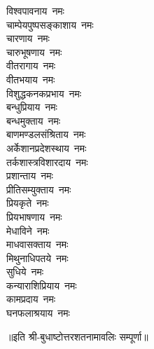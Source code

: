 \begin{flushleft}
\begin{multicols}{2}
विश्वपावनाय~नमः\\
चाम्पेयपुष्पसङ्काशाय~नमः\\
चारणाय~नमः\\
चारुभूषणाय~नमः\\
वीतरागाय~नमः\hfill{}\\
वीतभयाय~नमः\\
विशुद्धकनकप्रभाय~नमः\\
बन्धुप्रियाय~नमः\\
बन्धमुक्ताय~नमः\\
बाणमण्डलसंश्रिताय~नमः\\
अर्केशानप्रदेशस्थाय~नमः\\
तर्कशास्त्रविशारदाय~नमः\\
प्रशान्ताय~नमः\\
प्रीतिसम्युक्ताय~नमः\\
प्रियकृते~नमः\hfill{}\\
प्रियभाषणाय~नमः\\
मेधाविने~नमः\\
माधवासक्ताय~नमः\\
मिथुनाधिपतये~नमः\\
सुधिये~नमः\\
कन्याराशिप्रियाय~नमः\\
कामप्रदाय~नमः\\
घनफलाश्रयाय~नमः\\
\end{multicols}
\end{flushleft}
॥इति श्री-बुधाष्टोत्तरशतनामावलिः सम्पूर्णा॥
